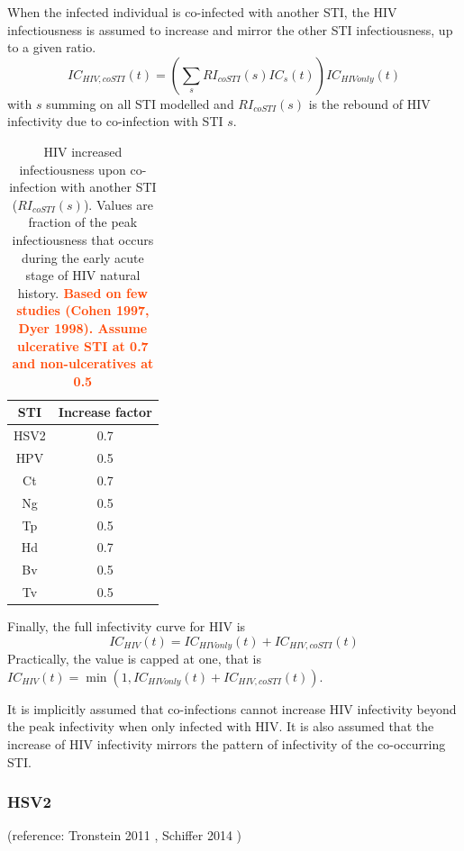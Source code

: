 \documentclass[11pt, onecolumn]{article}
\newcommand{\warning}[1]{\textbf{\textcolor{OrangeRed}{#1}}}
\begin{document}
When the infected individual is co-infected with another STI, the HIV infectiousness is assumed to increase and mirror the other STI infectiousness, up to a given ratio.
$$IC_{HIV,coSTI}(t) = \left(\sum_s RI_{coSTI}(s) IC_{s}(t)\right)  IC_{HIVonly}(t) $$
with $s$ summing on all STI modelled and $RI_{coSTI}(s)$ is the rebound of HIV infectivity due to co-infection with STI $s$.

\begin{table}[htdp]
\begin{center}
\begin{tabular}{|c|c|}
\hline
STI & Increase factor \\
\hline
HSV2 & 0.7\\
HPV & 0.5\\
Ct & 0.7\\
Ng & 0.5\\
Tp & 0.5\\
Hd & 0.7\\
Bv & 0.5\\
Tv & 0.5\\
\hline
\end{tabular}
\end{center}
\caption{HIV increased infectiousness upon co-infection with another STI ($RI_{coSTI}(s)$). Values are fraction of the peak infectiousness that occurs during the early acute stage of HIV natural history.\warning{ Based on few studies (Cohen 1997, Dyer 1998). Assume ulcerative STI at 0.7 and non-ulceratives at 0.5}}
\label{Table:rebound}
\end{table}%



Finally, the full infectivity curve for HIV is
$$ IC_{HIV}(t) = IC_{HIVonly}(t)+IC_{HIV,coSTI}(t)$$
Practically, the value is capped at one, that is $ IC_{HIV}(t) = \min(1,IC_{HIVonly}(t)+IC_{HIV,coSTI}(t))$. 

It is implicitly assumed that co-infections cannot increase HIV infectivity beyond the peak infectivity when only infected with HIV. It is also assumed that the increase of HIV infectivity mirrors the pattern of infectivity of the co-occurring STI.



\subsubsection{HSV2}
(reference: Tronstein 2011 \cite{Tronstein:2011vs}, Schiffer 2014 \cite{xxx})
\end{document}
